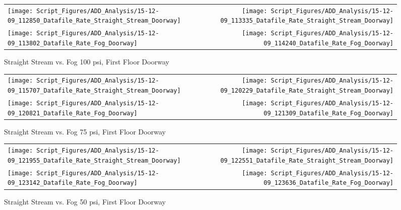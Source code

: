 \documentclass[12pt,oneside]{book}
\begin{document}
\clearpage

\begin{figure}[ht]
\begin{tabular*}{\textwidth}{lr}
\texttt{[image: Script\_Figures/ADD\_Analysis/15-12-09\_112850\_Datafile\_Rate\_Straight\_Stream\_Doorway]} &
\texttt{[image: Script\_Figures/ADD\_Analysis/15-12-09\_113335\_Datafile\_Rate\_Straight\_Stream\_Doorway]} \\
\texttt{[image: Script\_Figures/ADD\_Analysis/15-12-09\_113802\_Datafile\_Rate\_Fog\_Doorway]} &
\texttt{[image: Script\_Figures/ADD\_Analysis/15-12-09\_114240\_Datafile\_Rate\_Fog\_Doorway]} \\
\end{tabular*}
\caption{Straight Stream vs. Fog 100 psi, First Floor Doorway}
\label{fig:Straight Stream vs. Fog 100 psi, First Floor Doorway}
\end{figure}

\clearpage

\begin{figure}[ht]
\begin{tabular*}{\textwidth}{lr}
\texttt{[image: Script\_Figures/ADD\_Analysis/15-12-09\_115707\_Datafile\_Rate\_Straight\_Stream\_Doorway]} &
\texttt{[image: Script\_Figures/ADD\_Analysis/15-12-09\_120229\_Datafile\_Rate\_Straight\_Stream\_Doorway]} \\
\texttt{[image: Script\_Figures/ADD\_Analysis/15-12-09\_120821\_Datafile\_Rate\_Fog\_Doorway]} &
\texttt{[image: Script\_Figures/ADD\_Analysis/15-12-09\_121309\_Datafile\_Rate\_Fog\_Doorway]} \\
\end{tabular*}
\caption{Straight Stream vs. Fog 75 psi, First Floor Doorway}
\label{fig:Straight Stream vs. Fog 75 psi, First Floor Doorway}
\end{figure}

\clearpage

\begin{figure}[ht]
\begin{tabular*}{\textwidth}{lr}
\texttt{[image: Script\_Figures/ADD\_Analysis/15-12-09\_121955\_Datafile\_Rate\_Straight\_Stream\_Doorway]} &
\texttt{[image: Script\_Figures/ADD\_Analysis/15-12-09\_122551\_Datafile\_Rate\_Straight\_Stream\_Doorway]} \\
\texttt{[image: Script\_Figures/ADD\_Analysis/15-12-09\_123142\_Datafile\_Rate\_Fog\_Doorway]} &
\texttt{[image: Script\_Figures/ADD\_Analysis/15-12-09\_123636\_Datafile\_Rate\_Fog\_Doorway]} \\
\end{tabular*}
\caption{Straight Stream vs. Fog 50 psi, First Floor Doorway}
\label{fig:Straight Stream vs. Fog 50 psi, First Floor Doorway}
\end{figure}
\end{document}
